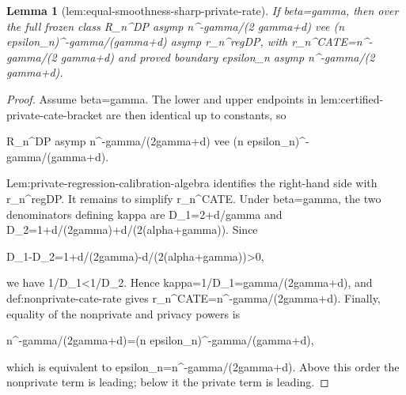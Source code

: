 \documentclass{article}
\newtheorem{lemma}{Lemma}
\begin{document}
\begin{lemma}[lem:equal-smoothness-sharp-private-rate]\label{lem:equal-smoothness-sharp-private-rate}
If beta=gamma, then over the full frozen class R_n^DP asymp n^{-gamma/(2 gamma+d)} vee (n epsilon_n)^{-gamma/(gamma+d)} asymp r_n^regDP, with r_n^CATE=n^{-gamma/(2 gamma+d)} and proved boundary epsilon_n asymp n^{-gamma/(2 gamma+d)}.
\end{lemma}
\begin{proof}
Assume beta=gamma. The lower and upper endpoints in lem:certified-private-cate-bracket are then identical up to constants, so

 R_n^DP asymp n^{-gamma/(2gamma+d)} vee (n epsilon_n)^{-gamma/(gamma+d)}.

Lem:private-regression-calibration-algebra identifies the right-hand side with r_n^regDP. It remains to simplify r_n^CATE. Under beta=gamma, the two denominators defining kappa are D_1=2+d/gamma and D_2=1+d/(2gamma)+d/(2(alpha+gamma)). Since

 D_1-D_2=1+d/(2gamma)-d/(2(alpha+gamma))>0,

we have 1/D_1<1/D_2. Hence kappa=1/D_1=gamma/(2gamma+d), and def:nonprivate-cate-rate gives r_n^CATE=n^{-gamma/(2gamma+d)}. Finally, equality of the nonprivate and privacy powers is

 n^{-gamma/(2gamma+d)}=(n epsilon_n)^{-gamma/(gamma+d)},

which is equivalent to epsilon_n=n^{-gamma/(2gamma+d)}. Above this order the nonprivate term is leading; below it the private term is leading.
\end{proof}
\end{document}
